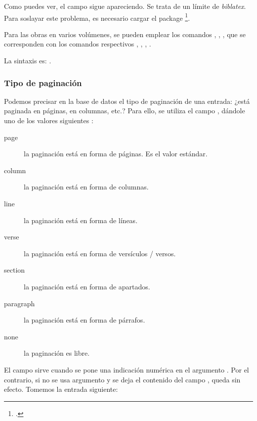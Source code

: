 \begin{quotation}
\cite[\pno~24, pasaje muy interesante.]{Junod1992}
\end{quotation}

Como puedes ver, el campo  sigue apareciendo. Se trata de
un límite de \emph{biblatex}. Para soslayar este problema, es
necesario cargar el package
\footcite{biblatex-true-citepages-omit}.






\begin{plusloins}
  Para las obras en varios volúmenes, se pueden emplear los comandos
  , , , 
  que se corresponden con los comandos respectivos , ,
  , .

La sintaxis es:
.
\end{plusloins}

\subsubsection{Tipo de paginación}

Podemos precisar en la base de datos el tipo de paginación de una
entrada: ¿está paginada en páginas, en columnas, etc.? Para ello, se
utiliza el campo , dándole uno de los valores siguientes :

\begin{description}
\item[page] la paginación está en forma de páginas. Es el valor estándar.
\item[column] la paginación está en forma de columnas.
\item[line] la paginación está en forma de líneas.
\item[verse] la paginación está en forma de versículos / versos.
\item[section] la paginación está en forma de apartados.
\item[paragraph] la paginación está en forma de párrafos.
\item[none] la paginación es libre.
\end{description}

El campo  sirve cuando se pone una indicación
numérica en el argumento . Por el contrario, si no se
usa argumento  y se deja el contenido del campo
, queda sin efecto. Tomemos la entrada siguiente:

